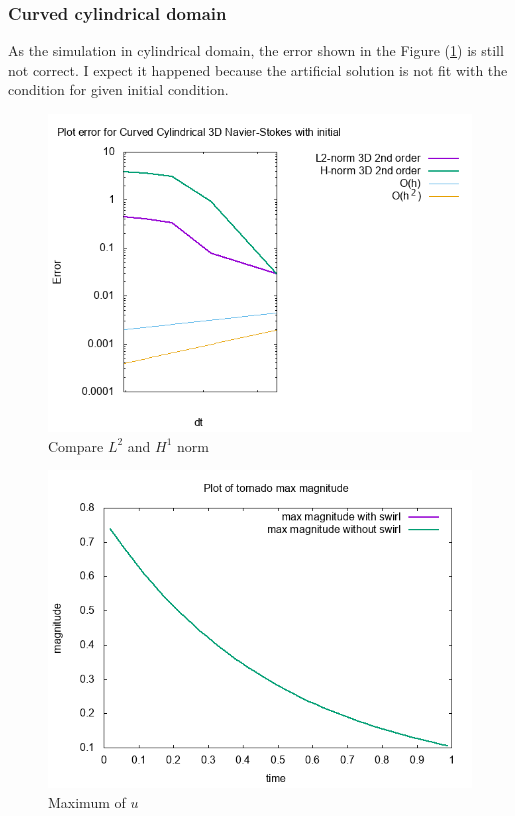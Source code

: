 \documentclass[a4paper]{article}
\begin{document}
\subsubsection{Curved cylindrical domain}
As the simulation in cylindrical domain, the error shown in the Figure (\ref{fig:errorcurved}) is still not correct. I expect it happened because the artificial solution is not fit with the condition for given initial condition.
\begin{figure}[h!]
	\centering
	\includegraphics[width=1\linewidth]{NS_3D/error_curved}
	\caption{Compare $ L^{2} $ and $ H^{1} $ norm}
	\label{fig:errorcurved}
\end{figure}
\begin{figure}[h!]
	\centering
	\includegraphics[width=1\linewidth]{NS_3D/curved}
	\caption{Maximum of $ u $}
	\label{fig:curved}
\end{figure}
\end{document}
